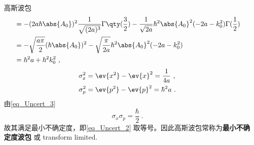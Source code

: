 \begin{example}{高斯波包}
\begin{equation}
\begin{aligned}
&=-(2a\hbar\abs{A_0})^2\frac{1}{\sqrt{(2a)^3}}\Gamma\qty(\frac{3}{2})-\frac{1}{\sqrt{2a}}\hbar^2 \abs{A_0}^2(-2a-k_0^2)\Gamma(\frac{1}{2})\\
&=-\sqrt{\frac{a\pi}{2}}(\hbar\abs{A_0})^2-\sqrt{\frac{\pi}{2a}}\hbar^2 \abs{A_0}^2(-2a-k_0^2)\\
&=\hbar^2a+\hbar^2k_0^2~,
\end{aligned}
\end{equation}
\begin{equation}\label{eq_Uncert_3}
\begin{aligned}
\sigma_x^2&=\ev{x^2}-\ev{x}^2=\frac{1}{4a}~, \\
\sigma_p^2&=\ev{p^2}-\ev{p}^2=\hbar^2a~.
\end{aligned}
\end{equation}
由\autoref{eq_Uncert_3} 
\begin{equation}
\sigma_x\sigma_p=\frac{\hbar}{2}~.
\end{equation}
故其满足最小不确定度，即\autoref{eq_Uncert_2} 取等号。因此高斯波包常称为\textbf{最小不确定度波包} 或 transform limited.
\end{example}














